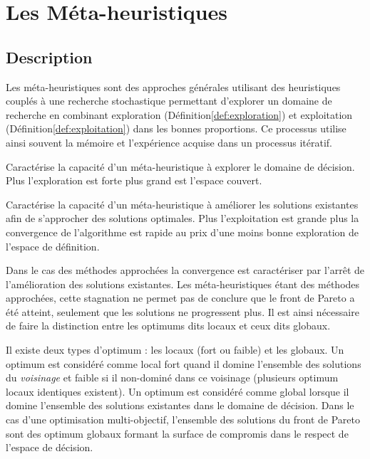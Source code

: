 \section{Les Méta-heuristiques} %
\label{sec:les_meta_heuristiques}
\subsection{Description} %
\label{sub:description}
Les méta-heuristiques sont des approches générales utilisant des heuristiques
couplés à une recherche stochastique permettant d’explorer un domaine de recherche
en combinant exploration (Définition\ref{def:exploration}) et exploitation (Définition\ref{def:exploitation})
dans les bonnes proportions. Ce processus utilise ainsi souvent la mémoire et
l’expérience acquise dans un processus itératif.

\begin{Def}[Exploration]\label{def:exploration}
Caractérise la capacité d’un méta-heuristique à explorer le domaine de décision.
Plus l’exploration est forte plus grand est l’espace couvert.
\end{Def}

\begin{Def}[Exploitation]\label{def:exploitation}
Caractérise la capacité d’un méta-heuristique à améliorer les solutions existantes
afin de s’approcher des solutions optimales. Plus l’exploitation est grande plus
la convergence de l’algorithme est rapide au prix d’une moins bonne exploration
de l’espace de définition.
\end{Def}

\begin{Def}[Convergence]\label{def:convergence}
Dans le cas des méthodes approchées la convergence est caractériser par l’arrêt
de l’amélioration des solutions existantes. Les méta-heuristiques étant des méthodes
approchées, cette stagnation ne permet pas de conclure que le front de Pareto a été
atteint, seulement que les solutions ne progressent plus. Il est ainsi nécessaire
de faire la distinction entre les optimums dits locaux et ceux dits globaux.
\end{Def}

\begin{Def}\label{def:optimum}
Il existe deux types d’optimum : les locaux (fort ou faible) et les globaux.
Un optimum est considéré comme local fort quand il domine l’ensemble des solutions
du \emph{voisinage} et faible si il non-dominé dans ce voisinage (plusieurs
optimum locaux identiques existent). Un optimum est considéré comme global lorsque il domine
l’ensemble des solutions existantes dans le domaine de décision. Dans le cas d’une
optimisation multi-objectif, l’ensemble des solutions du front de Pareto sont des
optimum globaux formant la surface de compromis dans le respect de l’espace de
décision.
\end{Def}


